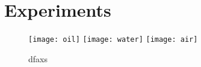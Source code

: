 \chapter{Experiments}


\begin{figure}[!hbt]
  \centering
  \texttt{[image: oil]}
  \texttt{[image: water]}
  \texttt{[image: air]}
  \caption{dfaxs}
  \label{fig:immersion-bfp-scan}
\end{figure}

